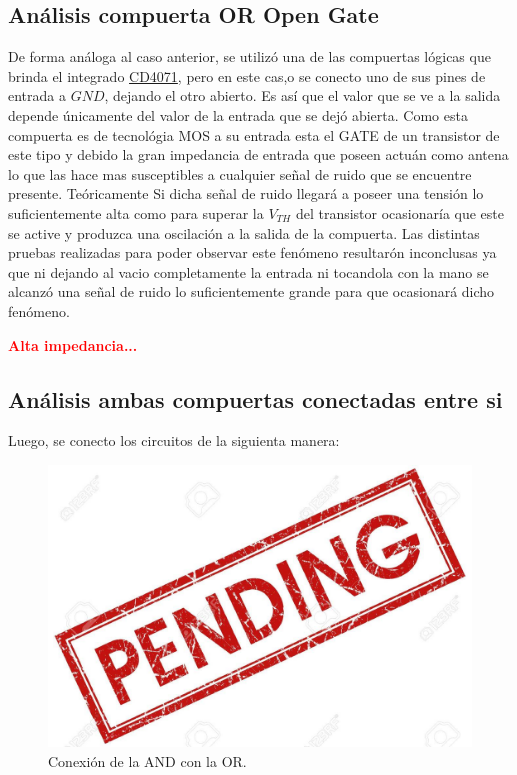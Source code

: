 \subsection{Análisis compuerta OR Open Gate}

De forma análoga al caso anterior, se utilizó una de las compuertas lógicas que brinda el integrado \href{http://www.ti.com/lit/ds/symlink/cd4071b.pdf}{CD4071}, pero en este cas,o se conecto uno de sus pines de entrada a $GND$, dejando el otro abierto. Es así que el valor que se ve a la salida depende únicamente del valor de la entrada que se dejó abierta. Como esta compuerta es de tecnológia MOS a su entrada esta el GATE de un transistor de este tipo y debido la gran impedancia de entrada que poseen actuán como antena lo que las hace mas susceptibles a cualquier señal de ruido que se encuentre presente. Teóricamente Si dicha señal de ruido llegará a poseer una tensión lo suficientemente alta como para superar la $V_{TH}$ del transistor ocasionaría que este se active y produzca una oscilación a la salida de la compuerta. Las distintas pruebas realizadas para poder observar este fenómeno resultarón inconclusas ya que ni dejando al vacio completamente la entrada ni tocandola con la mano se alcanzó una señal de ruido lo suficientemente grande para que ocasionará dicho fenómeno.

\begin{center}
	\huge{\textcolor{red}{\textbf{Alta impedancia...}}}
\end{center}


\subsection{Análisis ambas compuertas conectadas entre si}

Luego, se conecto los circuitos de la siguienta manera:
\begin{figure}[h]
    \centering
    \includegraphics{ImagenesEjercicio5/pend.jpg}
    \caption{Conexión de la AND con la OR.}
\end{figure}

